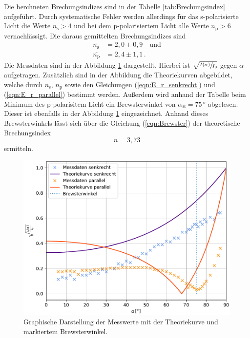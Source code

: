 Die berchneten Brechungsindizes sind in der Tabelle \ref{tab:Brechungsindex} aufgeführt. Durch systematische Fehler werden allerdings für das s-polarisierte Licht
die Werte $n_{\text{s}} > 4$ und bei dem p-polarisiertem Licht alle Werte $n_{\text{p}} > 6$ vernachlässigt. Die daraus gemittelten Brechungsindizes sind
\begin{align*}
  \overline{n_{\text{s}}} &= 2,0\pm 0,9\quad \text{und}\\
  \overline{n_{\text{p}}} &= 2,4\pm 1,1\,.
\end{align*}
Die Messdaten sind in der Abbildung \ref{fig:plot} dargestellt. Hierbei ist $\sqrt{\sfrac{I(\alpha)}{I_0}}$ gegen $\alpha$ aufgetragen. Zusätzlich sind in der Abbildung
die Theoriekurven abgebildet, welche durch $\overline{n_{\text{s}}}$, $\overline{n_{\text{p}}}$ sowie den Gleichungen (\ref{eqn:E_r_senkrecht}) und (\ref{eqn:E_r_parallel}) bestimmt werden.
Außerdem wird anhand der Tabelle beim Minimum des p-polarisitem Licht ein Brewsterwinkel von $\alpha_{\text{B}} = 75\,°$ abgelesen. Dieser ist ebenfalls in der Abbildung \ref{fig:plot} eingezeichnet.
Anhand dieses Brewsterwinkels lässt sich über die Gleichung (\ref{eqn:Brewster}) der theoretische Brechungsindex $$n = 3,73$$ ermitteln.
\begin{figure}[H]
  \includegraphics[width=\textwidth]{plot.pdf}
  \caption{Graphische Darstellung der Messwerte mit der Theoriekurve und markiertem Brewsterwinkel.}
  \label{fig:plot}
\end{figure}

